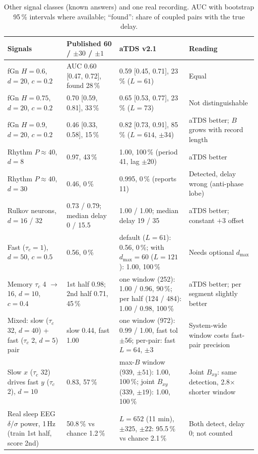 \documentclass[11pt,a4paper]{article}
\begin{document}
\begin{table}[t]
\centering
\caption{Other signal classes (known answers) and one real recording. AUC with bootstrap 95\,\% intervals where available; ``found'': share of coupled pairs with the true delay.}
\label{tab:signals}
\footnotesize
\begin{tabularx}{\textwidth}{>{\raggedright\arraybackslash}p{3.4cm}LLL}
\toprule
Signals & Published 60 / $\pm30$ / $\pm1$ & aTDS v2.1 & Reading \\
\midrule
fGn $H = 0.6$, $d = 20$, $c = 0.2$ & AUC 0.60 [0.47, 0.72], found 28\,\% & 0.59 [0.45, 0.71], 23\,\% ($L = 61$) & Equal \\
fGn $H = 0.75$, $d = 20$, $c = 0.2$ & 0.70 [0.59, 0.81], 33\,\% & 0.65 [0.53, 0.77], 23\,\% ($L = 73$) & Not distinguishable \\
fGn $H = 0.9$, $d = 20$, $c = 0.2$ & 0.46 [0.33, 0.58], 15\,\% & 0.82 [0.73, 0.91], 85\,\% ($L = 614$, $\pm34$) & aTDS better; $B$ grows with record length \\
Rhythm $P \approx 40$, $d = 8$ & 0.97, 43\,\% & 1.00, 100\,\% (period 41, lag $\pm20$) & aTDS better \\
Rhythm $P \approx 40$, $d = 30$ & 0.46, 0\,\% & 0.995, 0\,\% (reports 11) & Detected, delay wrong (anti-phase lobe) \\
Rulkov neurons, $d = 16$ / 32 & 0.73 / 0.79; median delay 0 / 15.5 & 1.00 / 1.00; median delay 19 / 35 & aTDS better; constant $+3$ offset \\
Fast ($\tau_c = 1$), $d = 50$, $c = 0.5$ & 0.56, 0\,\% & default ($L = 61$): 0.56, 0\,\%; with $d_{\max} = 60$ ($L = 121$): 1.00, 100\,\% & Needs optional $d_{\max}$ \\
Memory $\tau_c$ 4 $\to$ 16, $d = 10$, $c = 0.4$ & 1st half 0.98; 2nd half 0.71, 45\,\% & one window (252): 1.00 / 0.96, 90\,\%; per half (124 / 484): 1.00 / 0.98, 100\,\% & aTDS better; per segment slightly better \\
Mixed: slow ($\tau_c$ 32, $d = 40$) + fast ($\tau_c$ 2, $d = 5$) pair & slow 0.44, fast 1.00 & one window (972): 0.99 / 1.00, fast tol $\pm56$; per-pair: fast $L = 64$, $\pm3$ & System-wide window costs fast-pair precision \\
Slow $x$ ($\tau_c$ 32) drives fast $y$ ($\tau_c$ 2), $d = 10$ & 0.83, 57\,\% & max-$B$ window (939, $\pm51$): 1.00, 100\,\%; joint $B_{xy}$ (339, $\pm19$): 1.00, 100\,\% & Joint $B_{xy}$: same detection, 2.8$\times$ shorter window \\
Real sleep EEG $\delta$/$\sigma$ power, 1\,Hz (train 1st half, score 2nd) & 50.8\,\% vs chance 1.2\,\% & $L = 652$ (11 min), $\pm325$, $\pm22$: 95.5\,\% vs chance 2.1\,\% & Both detect, delay 0; not counted \\
\bottomrule
\end{tabularx}
\end{table}
\end{document}
